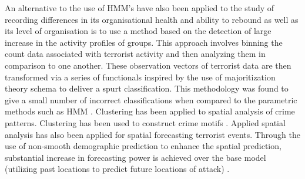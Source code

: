 An alternative to the use of HMM's have also been applied to the study of recording differences in its organisational health and ability to rebound as well as its level of organisation is to use a method based on the detection of large increase in the activity profiles of groups. This approach involves binning the count data associated with terrorist activity and then analyzing  them in comparison to one another. These observation vectors of terrorist data are then transformed via a series of functionals inspired by the use of majoritization theory schema to deliver a spurt classification. This methodology was found to give a small number of incorrect classifications when compared to the parametric methods such as HMM \citep{raghavan2016tracking}. 
Clustering has been applied to spatial analysis of crime patterns. Clustering has been used to construct crime motifs \citep{nath2006crime}. Applied spatial analysis has also been applied for spatial forecasting terrorist events. Through the use of non-smooth demographic prediction to enhance the spatial prediction, substantial  increase in forecasting power is achieved over the base model (utilizing past locations to predict future locations of attack) \citep{brown2004spatial}.

